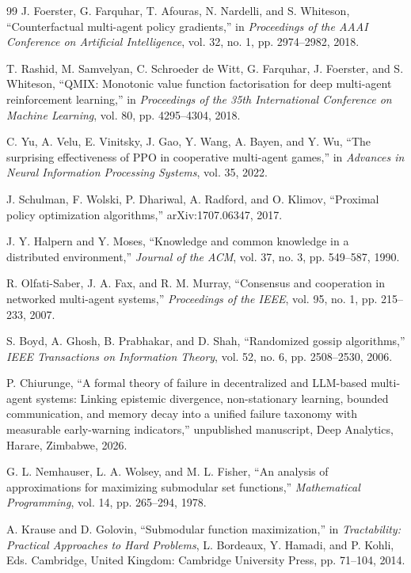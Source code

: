 \documentclass[10pt,twocolumn,a4paper]{article}
\begin{document}
\begin{thebibliography}{99}
J. Foerster, G. Farquhar, T. Afouras, N. Nardelli, and S. Whiteson, ``Counterfactual multi-agent policy gradients,'' in \emph{Proceedings of the AAAI Conference on Artificial Intelligence}, vol. 32, no. 1, pp. 2974--2982, 2018.

T. Rashid, M. Samvelyan, C. Schroeder de Witt, G. Farquhar, J. Foerster, and S. Whiteson, ``QMIX: Monotonic value function factorisation for deep multi-agent reinforcement learning,'' in \emph{Proceedings of the 35th International Conference on Machine Learning}, vol. 80, pp. 4295--4304, 2018.

C. Yu, A. Velu, E. Vinitsky, J. Gao, Y. Wang, A. Bayen, and Y. Wu, ``The surprising effectiveness of PPO in cooperative multi-agent games,'' in \emph{Advances in Neural Information Processing Systems}, vol. 35, 2022.

J. Schulman, F. Wolski, P. Dhariwal, A. Radford, and O. Klimov, ``Proximal policy optimization algorithms,'' arXiv:1707.06347, 2017.

J. Y. Halpern and Y. Moses, ``Knowledge and common knowledge in a distributed environment,'' \emph{Journal of the ACM}, vol. 37, no. 3, pp. 549--587, 1990.

R. Olfati-Saber, J. A. Fax, and R. M. Murray, ``Consensus and cooperation in networked multi-agent systems,'' \emph{Proceedings of the IEEE}, vol. 95, no. 1, pp. 215--233, 2007.

S. Boyd, A. Ghosh, B. Prabhakar, and D. Shah, ``Randomized gossip algorithms,'' \emph{IEEE Transactions on Information Theory}, vol. 52, no. 6, pp. 2508--2530, 2006.

P. Chiurunge, ``A formal theory of failure in decentralized and LLM-based multi-agent systems: Linking epistemic divergence, non-stationary learning, bounded communication, and memory decay into a unified failure taxonomy with measurable early-warning indicators,'' unpublished manuscript, Deep Analytics, Harare, Zimbabwe, 2026.

G. L. Nemhauser, L. A. Wolsey, and M. L. Fisher, ``An analysis of approximations for maximizing submodular set functions,'' \emph{Mathematical Programming}, vol. 14, pp. 265--294, 1978.

A. Krause and D. Golovin, ``Submodular function maximization,'' in \emph{Tractability: Practical Approaches to Hard Problems}, L. Bordeaux, Y. Hamadi, and P. Kohli, Eds. Cambridge, United Kingdom: Cambridge University Press, pp. 71--104, 2014.


\end{thebibliography}
\end{document}
